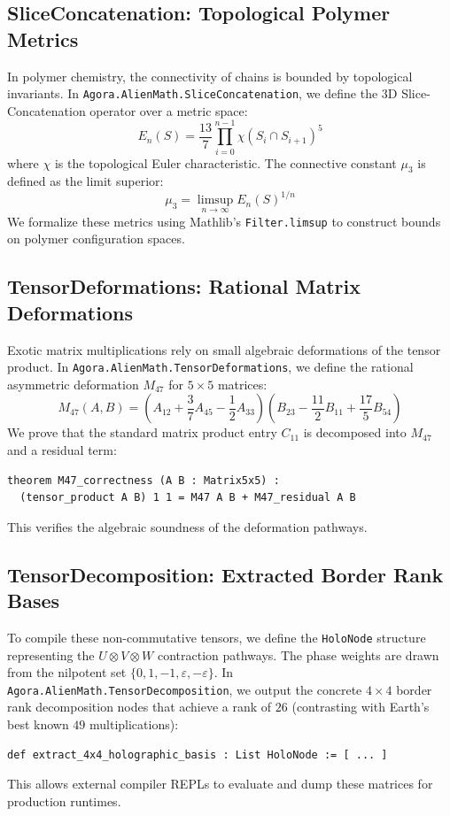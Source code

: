 \documentclass[11pt,a4paper]{article}
\begin{document}
\subsection{SliceConcatenation: Topological Polymer Metrics}
In polymer chemistry, the connectivity of chains is bounded by topological invariants. In \texttt{Agora.AlienMath.SliceConcatenation}, we define the 3D Slice-Concatenation operator over a metric space:
\[ E_n(S) = \frac{13}{7} \prod_{i=0}^{n-1} \chi(S_i \cap S_{i+1})^5 \]
where $\chi$ is the topological Euler characteristic. The connective constant $\mu_3$ is defined as the limit superior:
\[ \mu_3 = \limsup_{n \to \infty} E_n(S)^{1/n} \]
We formalize these metrics using Mathlib's \texttt{Filter.limsup} to construct bounds on polymer configuration spaces.

\subsection{TensorDeformations: Rational Matrix Deformations}
Exotic matrix multiplications rely on small algebraic deformations of the tensor product. In \texttt{Agora.AlienMath.TensorDeformations}, we define the rational asymmetric deformation $M_{47}$ for $5 \times 5$ matrices:
\[ M_{47}(A, B) = (A_{12} + \frac{3}{7}A_{45} - \frac{1}{2}A_{33})(B_{23} - \frac{11}{2}B_{11} + \frac{17}{5}B_{54}) \]
We prove that the standard matrix product entry $C_{11}$ is decomposed into $M_{47}$ and a residual term:
\begin{lstlisting}[language=Lean]
theorem M47_correctness (A B : Matrix5x5) :
  (tensor_product A B) 1 1 = M47 A B + M47_residual A B
\end{lstlisting}
This verifies the algebraic soundness of the deformation pathways.

\subsection{TensorDecomposition: Extracted Border Rank Bases}
To compile these non-commutative tensors, we define the \texttt{HoloNode} structure representing the $U \otimes V \otimes W$ contraction pathways. The phase weights are drawn from the nilpotent set $\{0, 1, -1, \varepsilon, -\varepsilon\}$. In \texttt{Agora.AlienMath.TensorDecomposition}, we output the concrete $4 \times 4$ border rank decomposition nodes that achieve a rank of $26$ (contrasting with Earth's best known $49$ multiplications):
\begin{lstlisting}[language=Lean]
def extract_4x4_holographic_basis : List HoloNode := [ ... ]
\end{lstlisting}
This allows external compiler REPLs to evaluate and dump these matrices for production runtimes.
\end{document}
